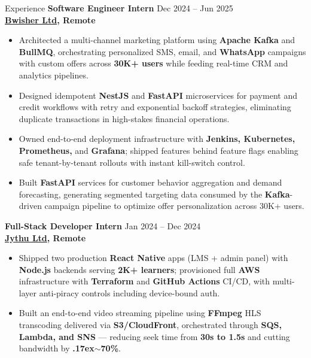 \documentclass{resume}
\begin{document}
\begin{rSection}{Experience}
\scriptsize \textbf{Software Engineer Intern} \hfill Dec 2024 -- Jun 2025\\
\textbf{\href{https://bwishernepal.com/}{Bwisher Ltd}, Remote}
\begin{itemize}\itemsep -4pt
    \item Architected a multi-channel marketing platform using \textbf{Apache Kafka} and \textbf{BullMQ}, orchestrating personalized SMS, email, and \textbf{WhatsApp} campaigns with custom offers across \textbf{30K+ users} while feeding real-time CRM and analytics pipelines.
    \item Designed idempotent \textbf{NestJS} and \textbf{FastAPI} microservices for payment and credit workflows with retry and exponential backoff strategies, eliminating duplicate transactions in high-stakes financial operations.
    \item Owned end-to-end deployment infrastructure with \textbf{Jenkins, Kubernetes, Prometheus,} and \textbf{Grafana}; shipped features behind feature flags enabling safe tenant-by-tenant rollouts with instant kill-switch control.
    \item Built \textbf{FastAPI} services for customer behavior aggregation and demand forecasting, generating segmented targeting data consumed by the \textbf{Kafka}-driven campaign pipeline to optimize offer personalization across 30K+ users.
\end{itemize}

\scriptsize \textbf{Full-Stack Developer Intern} \hfill Jan 2024 -- Dec 2024\\
\textbf{\href{https://jythu.com/}{Jythu Ltd}, Remote}
\begin{itemize}\itemsep -4pt
    \item Shipped two production \textbf{React Native} apps (LMS + admin panel) with \textbf{Node.js} backends serving \textbf{2K+ learners}; provisioned full \textbf{AWS} infrastructure with \textbf{Terraform} and \textbf{GitHub Actions} CI/CD, with multi-layer anti-piracy controls including device-bound auth.
    \item Built an end-to-end video streaming pipeline using \textbf{FFmpeg} HLS transcoding delivered via \textbf{S3/CloudFront}, orchestrated through \textbf{SQS, Lambda, and SNS} --- reducing seek time from \textbf{30s to 1.5s} and cutting bandwidth by \textbf{{\raise.17ex\hbox{$\scriptstyle\sim$}}70\%}.
\end{itemize}

\end{rSection}\vspace{-0.7em}
\end{document}
